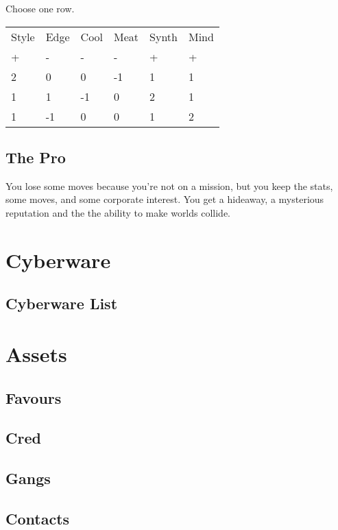 \documentclass{tufte-book}
\begin{document}
Choose one row.
\begin{table}[ht]
\centering
{}\selectfont
\begin{tabular}{llllll}
\toprule
Style & Edge & Cool & Meat & Synth & Mind\\
+&-&-&-&+&+\\
\midrule
2&0&0&-1&1&1\\
1&1&-1&0&2&1\\
1&-1&0&0&1&2\\
\bottomrule
\end{tabular}
\end{table}


\section{The Pro} \label{sec:The Pro}
You lose some moves because you're not on a mission, but you keep the stats, some moves, and some corporate interest. You get a hideaway, a mysterious reputation and the the ability to make worlds collide.


\chapter{Cyberware} \label{ch:cyberware}
\section{Cyberware List} \label{sec: Cyberware list}

\chapter{Assets} 	\label{ch:assets}
\section {Favours}	\label{sec:favours}
\section {Cred} 	\label{sec:cred}
\section {Gangs}	\label{sec: gangs}
\section {Contacts}	\label{sec: contacts}
\end{document}
